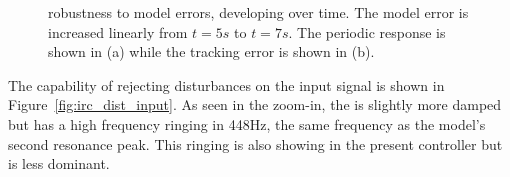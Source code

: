 \begin{figure}[h!]
  \centering %
  \qquad
  \caption{\label{fig:irc_dist} \abbrIRC robustness to model errors, developing over time. The model error is increased linearly from $t=5s$ to $t=7s$. The periodic response is shown in (a) while the tracking error is shown in (b).}
\end{figure}

\FloatBarrier
The \abbrIRC capability of rejecting disturbances on the input signal is shown in Figure~\ref{fig:irc_dist_input}. As seen in the zoom-in, the \abbrIRC is slightly more damped but has a high frequency ringing in 448Hz, the same frequency as the model's second resonance peak. This ringing is also showing in the present controller but is less dominant.

